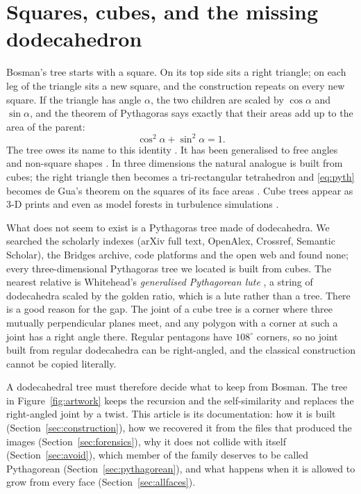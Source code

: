 \documentclass[11pt,a4paper]{article}
\theoremstyle{definition}
\theoremstyle{remark}
\begin{document}
\section{Squares, cubes, and the missing dodecahedron}

Bosman's tree starts with a square.  On its top side sits a right triangle;
on each leg of the triangle sits a new square, and the construction repeats on
every new square.  If the triangle has angle $\alpha$, the two children are
scaled by $\cos\alpha$ and $\sin\alpha$, and the theorem of Pythagoras says
exactly that their areas add up to the area of the parent:
\begin{equation}\label{eq:pyth}
  \cos^2\alpha+\sin^2\alpha = 1 .
\end{equation}
The tree owes its name to this identity \cite{Lauwerier1991}.  It has been
generalised to free angles and non-square shapes
\cite{Beck2014,Munz2019,Ruta2024}.  In three dimensions the natural analogue
is built from cubes; the right triangle then becomes a tri-rectangular
tetrahedron and \eqref{eq:pyth} becomes de Gua's theorem on the squares of
its face areas \cite{ConantBeyer1974}.  Cube trees appear as 3-D prints and
even as model forests in turbulence simulations \cite{Schrottle2013}.

What does not seem to exist is a Pythagoras tree made of dodecahedra.  We
searched the scholarly indexes (arXiv full text, OpenAlex, Crossref, Semantic
Scholar), the Bridges archive, code platforms and the open web and found none;
every three-dimensional Pythagoras tree we located is built from cubes.  The
nearest relative is Whitehead's \emph{generalised Pythagorean lute}
\cite{Whitehead2022}, a string of dodecahedra scaled by the golden ratio, which
is a lute rather than a tree.  There is a good reason for the gap.  The joint
of a cube tree is a corner where three mutually perpendicular planes meet, and
any polygon with a corner at such a joint has a right angle there.  Regular
pentagons have $108^\circ$ corners, so no joint built from regular
dodecahedra can be right-angled, and the classical construction cannot be
copied literally.

A dodecahedral tree must therefore decide what to keep from Bosman.  The tree
in Figure~\ref{fig:artwork} keeps the recursion and the self-similarity and
replaces the right-angled joint by a twist.  This article is its
documentation: how it is built (Section~\ref{sec:construction}), how we
recovered it from the files that produced the images
(Section~\ref{sec:forensics}), why it does not collide with itself
(Section~\ref{sec:avoid}), which member of the family deserves to be called
Pythagorean (Section~\ref{sec:pythagorean}), and what happens when it is
allowed to grow from every face (Section~\ref{sec:allfaces}).
\end{document}
